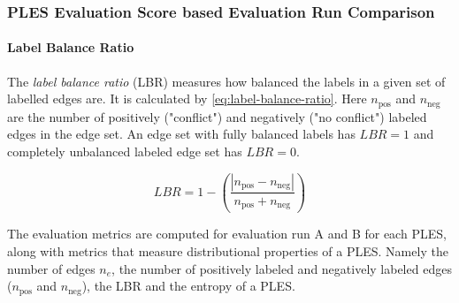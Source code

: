 \documentclass[11pt]{scrreprt}
\begin{document}
{{%

}

\subsubsection{PLES Evaluation Score based Evaluation Run Comparison}

\paragraph{Label Balance Ratio}
The \textit{label balance ratio} (LBR) measures how balanced the labels in a given set of labelled edges are. It is calculated by \cref{eq:label-balance-ratio}. Here \(n_\text{pos}\) and \(n_\text{neg}\) are the number of positively ("conflict") and negatively ("no conflict") labeled edges in the edge set.
An edge set with fully balanced labels has \(LBR = 1\) and completely unbalanced labeled edge set has \(LBR = 0\).

\begin{equation}
LBR = 1 - \left(\frac{\left|n_{\text{pos}} - n_{\text{neg}}\right|}{n_{\text{pos}} + n_{\text{neg}}}\right)
\label{eq:label-balance-ratio}
\end{equation}

The evaluation metrics are computed for evaluation run A and B for each PLES, along with metrics that measure distributional properties of a PLES. Namely the number of edges \(n_e\), the number of positively labeled and negatively labeled edges (\(n_\text{pos}\) and \(n_\text{neg}\)), the LBR  and the entropy of a PLES.

}
\end{document}
